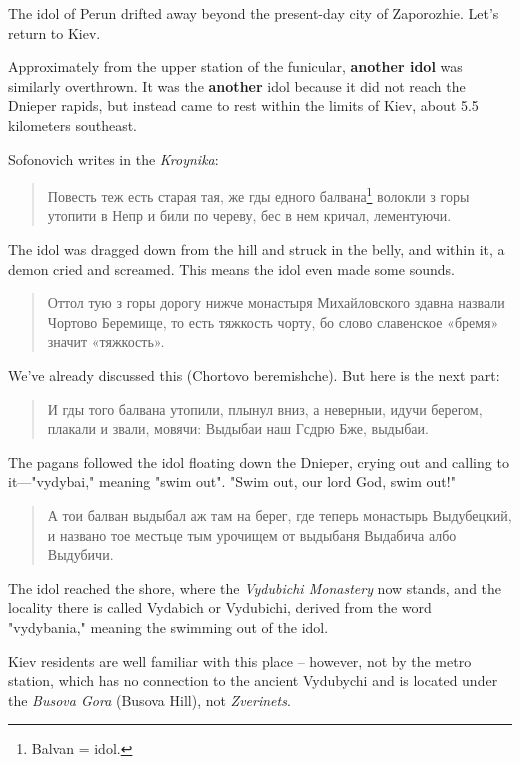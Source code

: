 \documentclass[a5paper,11pt,openany]{article}
\begin{document}
The idol of Perun drifted away beyond the present-day city of Zaporozhie. Let's return to Kiev.

Approximately from the upper station of the funicular, \textbf{another idol} was similarly overthrown. It was the \textbf{another} idol because it did not reach the Dnieper rapids, but instead came to rest within the limits of Kiev, about 5.5 kilometers southeast.

Sofonovich writes in the \textit{Kroynika}\cite{sofonovich01}:

\begin{quotation}
\noindent Повесть теж есть старая тая, же гды едного балвана\footnote{Balvan = idol.} волокли з горы утопити в Непр и били по череву, бес в нем кричал, лементуючи.
\end{quotation}

The idol was dragged down from the hill and struck in the belly, and within it, a demon cried and screamed. This means the idol even made some sounds.

\begin{quotation}
\noindent  Оттол тую з горы дорогу нижче монастыря Михайловского здавна назвали Чортово Беремище, то есть тяжкость чорту, бо слово славенское «бремя» значит «тяжкость». \end{quotation}

We've already discussed this (Chortovo beremishche). But here is the next part:

\begin{quotation}
\noindent  И гды того балвана утопили, плынул вниз, а неверныи, идучи берегом, плакали и звали, мовячи: Выдыбаи наш Гсдрю Бже, выдыбаи.
\end{quotation}

The pagans followed the idol floating down the Dnieper, crying out and calling to it—"vydybai," meaning "swim out". "Swim out, our lord God, swim out!"

\begin{quotation}
\noindent А тои балван выдыбал аж там на берег, где теперь монастырь Выдубецкий, и названо тое местьце тым урочищем от выдыбаня Выдабича албо Выдубичи.
\end{quotation}

The idol reached the shore, where the \textit{Vydubichi Monastery} now stands, and the locality there is called Vydabich or Vydubichi, derived from the word "vydybania," meaning the swimming out of the idol.

Kiev residents are well familiar with this place – however, not by the metro station, which has no connection to the ancient Vydubychi and is located under the \textit{Busova Gora} (Busova Hill), not \textit{Zverinets}.
\end{document}
